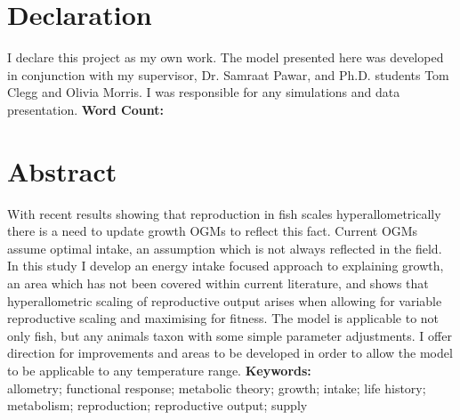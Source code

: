 \documentclass[a4paper, 11pt, hidelinks]{article} %
\newcommand\wordcount{} %
\begin{document}
	
	

	\section*{Declaration}
	I declare this project as my own work.  The model presented here was developed in conjunction with my supervisor, Dr. Samraat Pawar, and Ph.D. students Tom Clegg and Olivia Morris.  I was responsible for any simulations and data presentation.\newline
	\textbf{Word Count: \wordcount}

	\newpage
	
	\section*{Abstract}
	\linenumbers
	 
	With recent results showing that reproduction in fish scales hyperallometrically there is a need to update growth OGMs to reflect this fact.  Current OGMs assume optimal intake, an assumption which is not always reflected in the field.  In this study I develop an energy intake focused approach to explaining growth, an area which has not been covered within current literature, and shows that hyperallometric scaling of reproductive output arises when allowing for variable reproductive scaling and maximising for fitness.  The model is applicable to not only fish, but any animals taxon with some simple parameter adjustments.  I offer direction for improvements and areas to be developed in order to allow the model to be applicable to any temperature range.
	\vspace*{0.5 cm}
	\newline
%	
	\textbf{Keywords:}\\
	allometry; functional response; metabolic theory; growth; intake; life history; metabolism; reproduction; reproductive output; supply

	
	
	\nolinenumbers
	
	
\end{document}
